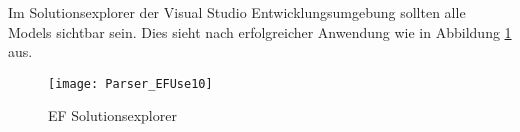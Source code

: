 Im Solutionsexplorer der Visual Studio Entwicklungsumgebung sollten alle Models sichtbar sein. Dies sieht nach erfolgreicher Anwendung wie in Abbildung \ref{fig:parsef10} aus. 
\begin{figure}[H]
    \centering
    \texttt{[image: Parser\_EFUse10]}
    \caption{EF Solutionsexplorer}
    \label{fig:parsef10}
\end{figure} 


%
%
